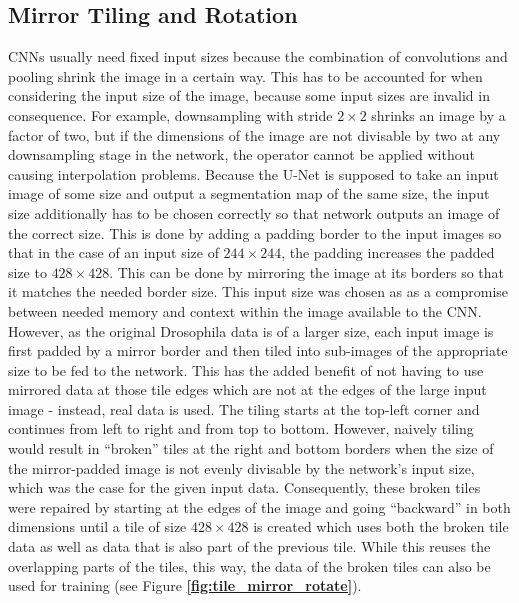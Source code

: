 		\subsection{Mirror Tiling and Rotation}
\label{subsec:mirror_tiling}
CNNs usually need fixed input sizes because the combination of convolutions and pooling shrink the image in a certain way. This has to be accounted for when considering the input size of the image, because some input sizes are invalid in consequence. For example, downsampling with stride $2 \times 2$ shrinks an image by a factor of two, but if the dimensions of the image are not divisable by two at any downsampling stage in the network, the operator cannot be applied without causing interpolation problems. Because the U-Net is supposed to take an input image of some size and output a segmentation map of the same size, the input size additionally has to be chosen correctly so that network outputs an image of the correct size. This is done by adding a padding border to the input images so that in the case of an input size of $244 \times 244$, the padding increases the padded size to $428 \times 428$. This can be done by mirroring the image at its borders so that it matches the needed border size. This input size was chosen as as a compromise between needed memory and context within the image available to the CNN.\\

However, as the original Drosophila data is of a larger size, each input image is first padded by a mirror border and then tiled into sub-images of the appropriate size to be fed to the network. This has the added benefit of not having to use mirrored data at those tile edges which are not at the edges of the large input image - instead, real data is used. The tiling starts at the top-left corner and continues from left to right and from top to bottom. However, naively tiling would result in ``broken'' tiles at the right and bottom borders when the size of the mirror-padded  image is not evenly divisable by the network's input size, which was the case for the given input data. Consequently, these broken tiles were repaired by starting at the edges of the image and going ``backward'' in both dimensions until a tile of size $428 \times 428$ is created which uses both the broken tile data as well as data that is also part of the previous tile. While this reuses the overlapping parts of the tiles, this way, the data of the broken tiles can also be used for training (see Figure \textbf{\ref{fig:tile_mirror_rotate}}).\\

